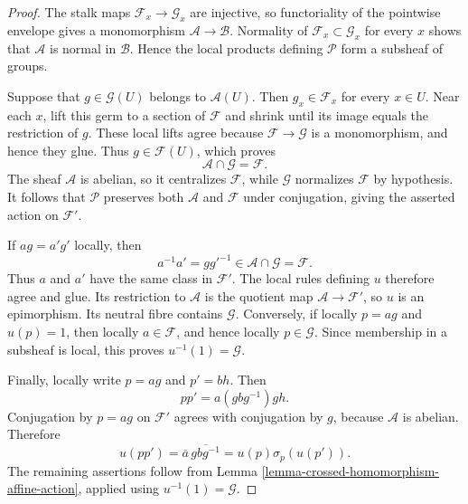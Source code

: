 \begin{proof}
The stalk maps $\mathcal F_x\to\mathcal G_x$ are injective, so
functoriality of the pointwise envelope gives a monomorphism
$\mathcal A\to\mathcal B$. Normality of
$\mathcal F_x\subset\mathcal G_x$ for every $x$ shows that
$\mathcal A$ is normal in $\mathcal B$. Hence the local products defining
$\mathcal P$ form a subsheaf of groups.

Suppose that $g\in\mathcal G(U)$ belongs to $\mathcal A(U)$. Then
$g_x\in\mathcal F_x$ for every $x\in U$. Near each $x$, lift this germ to
a section of $\mathcal F$ and shrink until its image equals the restriction
of $g$. These local lifts agree because $\mathcal F\to\mathcal G$ is a
monomorphism, and hence they glue. Thus $g\in\mathcal F(U)$, which proves
$$
\mathcal A\cap\mathcal G=\mathcal F.
$$
The sheaf $\mathcal A$ is abelian, so it centralizes $\mathcal F$, while
$\mathcal G$ normalizes $\mathcal F$ by hypothesis. It follows that
$\mathcal P$ preserves both $\mathcal A$ and $\mathcal F$ under
conjugation, giving the asserted action on $\mathcal F'$.

If $ag=a'g'$ locally, then
$$
a^{-1}a'=gg'^{-1}\in\mathcal A\cap\mathcal G=\mathcal F.
$$
Thus $a$ and $a'$ have the same class in $\mathcal F'$. The local rules
defining $u$ therefore agree and glue. Its restriction to $\mathcal A$ is
the quotient map $\mathcal A\to\mathcal F'$, so $u$ is an epimorphism. Its
neutral fibre contains $\mathcal G$. Conversely, if locally $p=ag$ and
$u(p)=1$, then locally $a\in\mathcal F$, and hence locally
$p\in\mathcal G$. Since membership in a subsheaf is local, this proves
$u^{-1}(1)=\mathcal G$.

Finally, locally write $p=ag$ and $p'=bh$. Then
$$
pp'=a(gbg^{-1})gh.
$$
Conjugation by $p=ag$ on $\mathcal F'$ agrees with conjugation by $g$,
because $\mathcal A$ is abelian. Therefore
$$
u(pp')=\overline a\,\overline{gbg^{-1}}
=u(p)\sigma_p(u(p')).
$$
The remaining assertions follow from
Lemma \ref{lemma-crossed-homomorphism-affine-action}, applied using
$u^{-1}(1)=\mathcal G$.
\end{proof}

